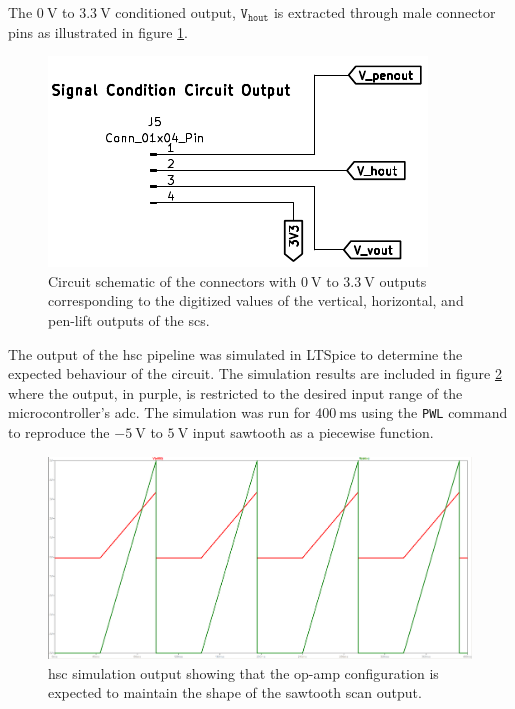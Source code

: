\documentclass[class=report,11pt,crop=false]{standalone}
\begin{document}
	The $\SI{0}{\volt}$ to $\SI{3.3}{\volt}$ conditioned output, $\texttt{V}_\texttt{hout}$ is extracted through male connector pins as illustrated in figure \ref{fig:sig-cond-output-schematic}. 
	

	
	\begin{figure}[h!]
		\centering
		\includegraphics[width=0.35\linewidth]{Figures/Methodology/sig-cond-output-ct-schematic}
		\caption{Circuit schematic of the connectors with $\SI{0}{\volt}$ to $\SI{3.3}{\volt}$ outputs corresponding to the digitized values of the vertical, horizontal, and pen-lift outputs of the \acrshort{scs}.}
		\label{fig:sig-cond-output-schematic}
	\end{figure}
	
	The output of the \acrshort{hsc} pipeline was simulated in LTSpice to determine the expected behaviour of the circuit. The simulation results are included in figure \ref{fig:sig-cond-hsc-sim-output} where the output, in purple, is restricted to the desired input range of the microcontroller's \acrshort{adc}. The simulation was run for $\SI{400}{\milli\second}$ using the \texttt{PWL} command to reproduce the $-\SI{5}{\volt}$ to $\SI{5}{\volt}$ input sawtooth as a piecewise function.  
	
	\begin{figure}[h!]
		\centering
		\includegraphics[width=0.7\linewidth]{Figures/Methodology/sig-cond-hsc-sim-output}
		\caption{\acrshort{hsc} simulation output showing that the op-amp configuration is expected to maintain the shape of the sawtooth scan output.}
		\label{fig:sig-cond-hsc-sim-output}
	\end{figure}
	
\end{document}
